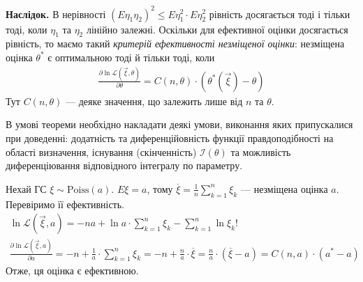 \noindent\textbf{Наслідок.} В нерівності $\left( E\eta_1 \eta_2 \right)^2 \leq E\eta_1^2 \cdot E\eta_2^2$ рівність досягається
тоді і тільки тоді, коли $\eta_1$ та $\eta_2$ лінійно залежні. Оскільки для ефективної оцінки досягається рівність, то маємо такий 
\emph{критерій ефективності незміщеної оцінки}: незміщена оцінка $\theta^*$ є оптимальною тоді й тільки тоді, коли
\begin{gather}
    \frac{\partial\ln \mathcal{L}(\vec{\xi}, \theta)}{\partial \theta} = C(n, \theta) \cdot\left(\theta^*(\vec{\xi}) - \theta\right)
\end{gather}
Тут $C(n, \theta)$ --- деяке значення, що залежить лише від $n$ та $\theta$.
\begin{remark}
    В умові теореми необхідно накладати деякі умови, виконання яких припускалися при доведенні: додатність та 
    диференційовність функції правдоподібності на області визначення,
    існування (скінченність) $\mathcal{I}(\theta)$ та можливість диференціювання відповідного інтегралу по параметру.
\end{remark}
\begin{example}
    Нехай ГС $\xi \sim \mathrm{Poiss}(a)$. $E\xi = a$, тому $\overline{\xi} = \frac{1}{n}\sum\limits_{k=1}^n \xi_k$ --- 
    незміщена оцінка $a$. Перевіримо її ефективність.
    \begin{gather*}
        \ln \mathcal{L}(\vec{\xi}, a) = -n a + \ln a \cdot \sum\limits_{k=1}^n \xi_k - \sum\limits_{k=1}^n \ln{\xi_k!} \\
        \frac{\partial  \ln \mathcal{L}(\vec{\xi}, a)}{\partial a} = -n + \frac{1}{a} \cdot \sum\limits_{k=1}^n \xi_k = 
        -n + \frac{n}{a} \cdot \overline{\xi} = \frac{n}{a} \cdot(\overline{\xi} - a) = C(n, a) \cdot(a^* - a)
    \end{gather*}
    Отже, ця оцінка є ефективною.
\end{example}

